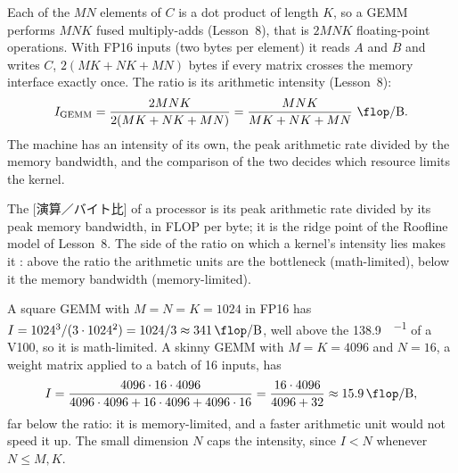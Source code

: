 \documentclass[../main.tex]{subfiles}
\begin{document}
Each of the $MN$ elements of $C$ is a dot product of length $K$, so a
GEMM performs $MNK$ fused multiply-adds (Lesson~8), that is $2MNK$
floating-point operations.  With
FP16 inputs (two bytes per element) it reads $A$ and $B$ and writes $C$,
$2(MK + NK + MN)$ bytes if every matrix crosses the memory interface
exactly once.  The ratio is its arithmetic intensity (Lesson~8):
\begin{equation}
  I_{\text{GEMM}}
  = \frac{2MNK}{2(MK + NK + MN)}
  = \frac{MNK}{MK + NK + MN}\ \si{\flop\per\byte} .
  \label{eq:l12-ai}
\end{equation}
%
The machine has an intensity of its own, the peak arithmetic rate
divided by the memory bandwidth, and the comparison of the two decides
which resource limits the kernel.

\begin{definition}
  The [演算／バイト比] of a processor is its peak
  arithmetic rate divided by its peak memory bandwidth, in FLOP per
  byte; it is the ridge point of the Roofline model of Lesson~8.  The
  side of the ratio on which a kernel's intensity lies makes it
  : above the
  ratio the arithmetic units are the bottleneck (math-limited), below it
  the memory bandwidth (memory-limited).
\end{definition}

\begin{example}
  \label{ex:l12-ai}
  A square GEMM with $M = N = K = 1024$ in FP16 has
  $I = 1024^3 / (3 \cdot 1024^2) = 1024/3 \approx
  \SI{341}{\flop\per\byte}$, well above the
  \SI{138.9}{\flop\per\byte} of a V100, so it is math-limited.  A skinny GEMM
  with $M = K = 4096$ and $N = 16$, a weight matrix applied to a batch
  of 16 inputs, has
  \[
    I = \frac{4096 \cdot 16 \cdot 4096}
             {4096 \cdot 4096 + 16 \cdot 4096 + 4096 \cdot 16}
      = \frac{16 \cdot 4096}{4096 + 32}
      \approx \SI{15.9}{\flop\per\byte} ,
  \]
  far below the ratio: it is memory-limited, and a faster arithmetic
  unit would not speed it up.  The small dimension $N$ caps the
  intensity, since $I < N$ whenever $N \le M, K$.
\end{example}
\end{document}
